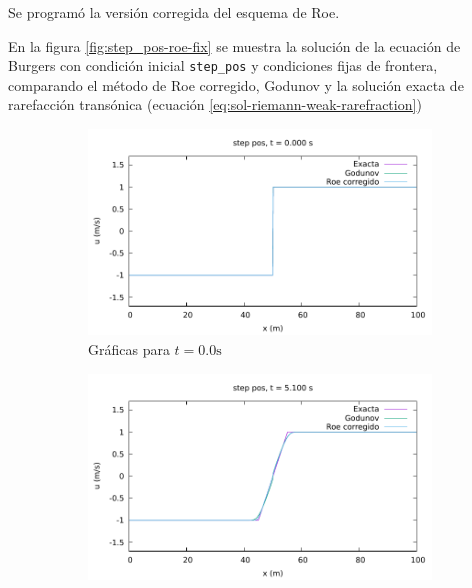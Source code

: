 \documentclass[12pt]{article}
\begin{document}
	Se programó la versión corregida del esquema de Roe. 
 	
	
	En la figura \ref{fig:step_pos-roe-fix} se muestra la solución de la ecuación de Burgers con condición inicial \texttt{step\_pos} y condiciones fijas de frontera, comparando el método de Roe corregido, Godunov y la solución exacta de rarefacción transónica (ecuación \ref{eq:sol-riemann-weak-rarefraction})
	
	\begin{figure}[h]
		\centering
		\begin{subfigure}[b]{0.4\textwidth}
			\includegraphics[width=\textwidth]{../burgers1DVF/results/sol_fijas/step_pos-roe-fix/000.pdf}
			\caption*{Gráficas para $t=0.0\unit{\second}$}
		\end{subfigure}
		\hfill
		\begin{subfigure}[b]{0.4\textwidth}
			\includegraphics[width=\textwidth]{../burgers1DVF/results/sol_fijas/step_pos-roe-fix/170.pdf}

\end{subfigure}
\end{figure}
\end{document}
